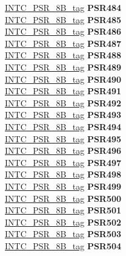 \begin{DoxyCompactItemize}
\begin{tabbing}
\>\>\mbox{\hyperlink{unionINTC__PSR__8B__tag}{INTC\_PSR\_8B\_tag}} {\bfseries PSR484}\\
\>\>\mbox{\hyperlink{unionINTC__PSR__8B__tag}{INTC\_PSR\_8B\_tag}} {\bfseries PSR485}\\
\>\>\mbox{\hyperlink{unionINTC__PSR__8B__tag}{INTC\_PSR\_8B\_tag}} {\bfseries PSR486}\\
\>\>\mbox{\hyperlink{unionINTC__PSR__8B__tag}{INTC\_PSR\_8B\_tag}} {\bfseries PSR487}\\
\>\>\mbox{\hyperlink{unionINTC__PSR__8B__tag}{INTC\_PSR\_8B\_tag}} {\bfseries PSR488}\\
\>\>\mbox{\hyperlink{unionINTC__PSR__8B__tag}{INTC\_PSR\_8B\_tag}} {\bfseries PSR489}\\
\>\>\mbox{\hyperlink{unionINTC__PSR__8B__tag}{INTC\_PSR\_8B\_tag}} {\bfseries PSR490}\\
\>\>\mbox{\hyperlink{unionINTC__PSR__8B__tag}{INTC\_PSR\_8B\_tag}} {\bfseries PSR491}\\
\>\>\mbox{\hyperlink{unionINTC__PSR__8B__tag}{INTC\_PSR\_8B\_tag}} {\bfseries PSR492}\\
\>\>\mbox{\hyperlink{unionINTC__PSR__8B__tag}{INTC\_PSR\_8B\_tag}} {\bfseries PSR493}\\
\>\>\mbox{\hyperlink{unionINTC__PSR__8B__tag}{INTC\_PSR\_8B\_tag}} {\bfseries PSR494}\\
\>\>\mbox{\hyperlink{unionINTC__PSR__8B__tag}{INTC\_PSR\_8B\_tag}} {\bfseries PSR495}\\
\>\>\mbox{\hyperlink{unionINTC__PSR__8B__tag}{INTC\_PSR\_8B\_tag}} {\bfseries PSR496}\\
\>\>\mbox{\hyperlink{unionINTC__PSR__8B__tag}{INTC\_PSR\_8B\_tag}} {\bfseries PSR497}\\
\>\>\mbox{\hyperlink{unionINTC__PSR__8B__tag}{INTC\_PSR\_8B\_tag}} {\bfseries PSR498}\\
\>\>\mbox{\hyperlink{unionINTC__PSR__8B__tag}{INTC\_PSR\_8B\_tag}} {\bfseries PSR499}\\
\>\>\mbox{\hyperlink{unionINTC__PSR__8B__tag}{INTC\_PSR\_8B\_tag}} {\bfseries PSR500}\\
\>\>\mbox{\hyperlink{unionINTC__PSR__8B__tag}{INTC\_PSR\_8B\_tag}} {\bfseries PSR501}\\
\>\>\mbox{\hyperlink{unionINTC__PSR__8B__tag}{INTC\_PSR\_8B\_tag}} {\bfseries PSR502}\\
\>\>\mbox{\hyperlink{unionINTC__PSR__8B__tag}{INTC\_PSR\_8B\_tag}} {\bfseries PSR503}\\
\>\>\mbox{\hyperlink{unionINTC__PSR__8B__tag}{INTC\_PSR\_8B\_tag}} {\bfseries PSR504}\\

\end{tabbing}
\end{DoxyCompactItemize}
